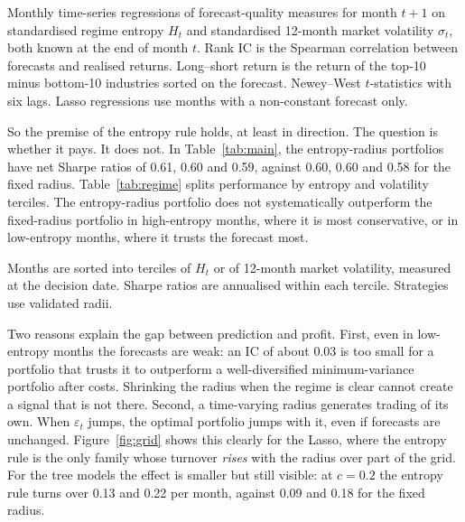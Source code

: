 \documentclass[11pt]{article}
\begin{document}
\begin{table}[!htbp]\centering
\caption{Does regime uncertainty predict forecast quality?}\label{tab:mech}
\small
\begin{minipage}{0.95\linewidth}\footnotesize\smallskip
Monthly time-series regressions of forecast-quality measures for month $t+1$ on standardised regime entropy $H_t$ and standardised 12-month market volatility $\sigma_t$, both known at the end of month $t$. Rank IC is the Spearman correlation between forecasts and realised returns. Long--short return is the return of the top-10 minus bottom-10 industries sorted on the forecast. Newey--West $t$-statistics with six lags. Lasso regressions use months with a non-constant forecast only.
\end{minipage}
\end{table}

So the premise of the entropy rule holds, at least in direction. The question is whether it pays. It does not. In Table~\ref{tab:main}, the entropy-radius portfolios have net Sharpe ratios of 0.61, 0.60 and 0.59, against 0.60, 0.60 and 0.58 for the fixed radius. Table~\ref{tab:regime} splits performance by entropy and volatility terciles. The entropy-radius portfolio does not systematically outperform the fixed-radius portfolio in high-entropy months, where it is most conservative, or in low-entropy months, where it trusts the forecast most.

\begin{table}[!htbp]\centering
\caption{Net Sharpe ratio (10bp) by regime-uncertainty and volatility terciles}\label{tab:regime}
\small
\begin{minipage}{0.95\linewidth}\footnotesize\smallskip
Months are sorted into terciles of $H_t$ or of 12-month market volatility, measured at the decision date. Sharpe ratios are annualised within each tercile. Strategies use validated radii.
\end{minipage}
\end{table}

Two reasons explain the gap between prediction and profit. First, even in low-entropy months the forecasts are weak: an IC of about 0.03 is too small for a portfolio that trusts it to outperform a well-diversified minimum-variance portfolio after costs. Shrinking the radius when the regime is clear cannot create a signal that is not there. Second, a time-varying radius generates trading of its own. When $\varepsilon_t$ jumps, the optimal portfolio jumps with it, even if forecasts are unchanged. Figure~\ref{fig:grid} shows this clearly for the Lasso, where the entropy rule is the only family whose turnover \emph{rises} with the radius over part of the grid. For the tree models the effect is smaller but still visible: at $c=0.2$ the entropy rule turns over 0.13 and 0.22 per month, against 0.09 and 0.18 for the fixed radius.
\end{document}
